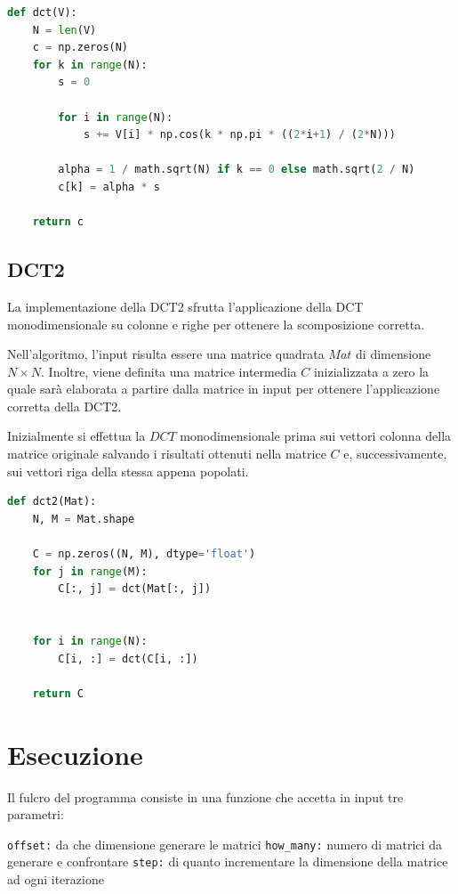 \documentclass[11pt,italian]{article}
\makeatletter
\newcommand*{\lstitem}[1][]{%
  \setbox0\hbox\bgroup
    \patchcmd{\lst@InlineM}{\@empty}{\@empty\egroup\item[\usebox0]\leavevmode\ignorespaces}{}{}%
    \lstinline[#1]%
}
\makeatother
\begin{document}
\begin{lstlisting}[language=python,emph={math,np},caption=Implementazione della DCT monodimensionale]
def dct(V):
    N = len(V)
    c = np.zeros(N)
    for k in range(N):
        s = 0

        for i in range(N):
            s += V[i] * np.cos(k * np.pi * ((2*i+1) / (2*N)))

        alpha = 1 / math.sqrt(N) if k == 0 else math.sqrt(2 / N)
        c[k] = alpha * s

    return c
\end{lstlisting}

\subsection{DCT2}
\label{section:dct2}
La implementazione della DCT2 sfrutta l'applicazione della DCT monodimensionale su colonne e righe per ottenere la scomposizione corretta.

Nell'algoritmo, l'input risulta essere una matrice quadrata $\mathit{Mat}$ di dimensione $N\times N$. Inoltre, viene definita una matrice intermedia $C$ inizializzata a zero la quale sarà elaborata a partire dalla matrice in input per ottenere l'applicazione corretta della DCT2.

Inizialmente si effettua la $\mathit{DCT}$ monodimensionale prima sui vettori colonna della matrice originale salvando i risultati ottenuti nella matrice $C$ e, successivamente, sui vettori riga della stessa appena popolati.

\begin{lstlisting}[language=python,emph={math,np},caption=Implementazione della DCT multidimensionale (DCT2)]
def dct2(Mat):
    N, M = Mat.shape

    C = np.zeros((N, M), dtype='float')
    for j in range(M):
        C[:, j] = dct(Mat[:, j])


    for i in range(N):
        C[i, :] = dct(C[i, :])

    return C
\end{lstlisting}

\newpage
\section{Esecuzione}
Il fulcro del programma consiste in una funzione che accetta in input tre parametri:
\begin{description}
    \lstitem{offset:} da che dimensione generare le matrici
    \lstitem{how_many:} numero di matrici da generare e confrontare
    \lstitem{step:} di quanto incrementare la dimensione della matrice ad ogni iterazione
\end{description}
\end{document}
